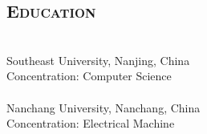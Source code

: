 \documentclass[margin,12pt]{res}
\begin{document}
\begin{resume}
\section{\textsc{Education}} 
                  \\
                Southeast University, Nanjing, China \\
                Concentration: Computer Science \\

                 \\
                Nanchang University, Nanchang, China \\
                Concentration: Electrical Machine \\
 
\end{resume}
\end{document}
